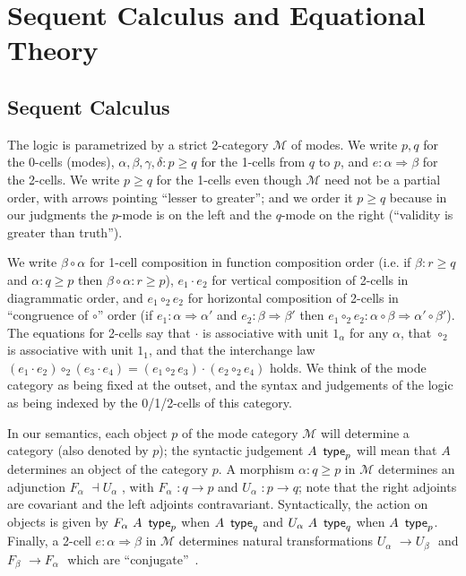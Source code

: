 \documentclass{drl-common/llncs}
\newcommand{\M}{\ensuremath{\mathcal{M}}}
\newcommand{\la}{\ensuremath{\dashv}}
\newcommand{\tc}[2]{\ensuremath{#1 \Rightarrow #2}}
\newcommand\compo[2]{\ensuremath{#1 \circ #2}}
\newcommand\compv[2]{\ensuremath{#1 \cdot #2}}
\newcommand\comph[2]{\ensuremath{#1 \mathbin{\circ_2} #2}}
\renewcommand\wftp[2]{\ensuremath{#1 \,\,\, \dsd{type}_{#2}}}
\newcommand\F[2]{\ensuremath{F_{#1} \,\, #2}}
\newcommand\U[2]{\ensuremath{U_{#1} \,\, #2}}
\begin{document}
\section{Sequent Calculus and Equational Theory}
\label{sec:rules}

\subsection{Sequent Calculus}

The logic is parametrized by a strict 2-category $\M$ of modes.  We
write $p,q$ for the 0-cells (modes), $\alpha,\beta,\gamma,\delta : p
\ge q$ for the 1-cells from $q$ to $p$, and $e : \tc \alpha \beta$ for
the 2-cells.  We write $p\ge q$ for the 1-cells even though $\M$ need
not be a partial order, with arrows pointing ``lesser to greater'';
and we order it $p\ge q$ because in our judgments the $p$-mode is on
the left and the $q$-mode on the right (``validity is greater than truth'').

We write
\compo{\beta}{\alpha} for 1-cell composition in function composition
order (i.e. if $\beta : r \ge q$ and $\alpha : q \ge p$ then
$\compo{\beta}{\alpha} : r \ge p$), \compv{e_1}{e_2} for vertical
composition of 2-cells in diagrammatic order, and \comph{e_1}{e_2} for
horizontal composition of 2-cells in ``congruence of \compo{}{}'' order
(if $e_1 : \tc \alpha {\alpha'}$ and $e_2 : \tc \beta \beta'$ then
$\comph{e_1}{e_2} :
\tc{\compo{\alpha}{\beta}}{\compo{\alpha'}{\beta'}}$).  The equations
for 2-cells say that \compv{}{} is associative with unit $1_\alpha$ for
any $\alpha$, that \comph{}{} is associative with unit $1_1$, and that
the interchange law $\comph{(\compv{e_1}{e_2})}{(\compv{e_3}{e_4})} =
\compv{(\comph{e_1}{e_3})}{(\comph{e_2}{e_4})}$ holds.  We think of the
mode category as being fixed at the outset, and the syntax and
judgements of the logic as being indexed by the 0/1/2-cells of this
category.

In our semantics, each object $p$ of the mode category $\M$
will determine a category (also denoted by $p$); the syntactic
judgement \wftp{A}{p} will mean that $A$ determines an object of the
category $p$.  A morphism $\alpha : q \ge p$ in $\M$ determines an
adjunction $\F\alpha{} \la \U\alpha{}$, with $\F \alpha {} : q \to p$
and $\U \alpha {} : p \to q$; note that the right adjoints are
covariant and the left adjoints contravariant.  Syntactically, the
action on objects is given by $\wftp{\F \alpha A}{p}$ when
$\wftp{A}{q}$ and $\wftp{\U \alpha A}{q}$ when $\wftp{A}{p}$.
Finally, a 2-cell $e:\tc\alpha\beta$ in $\M$ determines natural
transformations $\U\alpha{} \to \U\beta{}$ and $\F\beta{}\to
\F\alpha{}$ which are ``conjugate''~\citep[\S IV.7]{maclane98working}.
\end{document}
